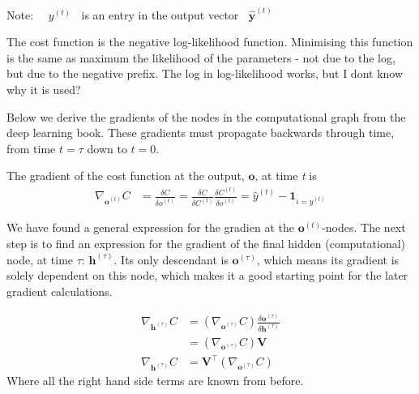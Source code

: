 \documentclass[12pt]{article}
\begin{document}
Note: $\quad y^{(t)} \;\;$ is an entry in the output vector $\;\; \mathbf{\hat{y}}^{(t)}$ \par
The cost function is the negative log-likelihood function. Minimising this function is the same as maximum the likelihood of the parameters - not due to the log, but due to the negative prefix. The log in log-likelihood works, but I dont know why it is used? \par
Below we derive the gradients of the nodes in the computational graph from the deep learning book. These gradients must propagate backwards through time, from time $t=\tau$ down to $t=0$.
\par
The gradient of the cost function at the output, $\mathbf{o}$, at time \textit{t} is
\begin{align}
    \nabla_{\mathbf{o}^{(t)}} C &= \frac{\delta C}{\delta o^{(t)}}
    = \frac{\delta C}{\delta C^{(t)}}\frac{\delta C^{(t)}}{\delta o^{(t)}}
    = \hat{y}^{(t)} - \mathbf{1}_{i=y^{(t)}}
\end{align}

We have found a general expression for the gradien at the $\mathbf{o}^{(t)}$-nodes. The next step is to find an expression for the gradient of the final hidden (computational) node, at time $\tau$: $\mathbf{h}^{(\tau)}$. Its only descendant is $\mathbf{o}^{(\tau)}$, which means its gradient is solely dependent on this node, which makes it a good starting point for the later gradient calculations.

\begin{align}
    \nabla_{\mathbf{h}^{(\tau)}} C &= \left(\nabla_{\mathbf{o}^{(\tau)}}C\right) \frac{\delta \mathbf{o}^{(\tau)}}{\delta \mathbf{h}^{(\tau)}}\\
    &= \left(\nabla_{\mathbf{o}^{(\tau)}}C\right) \mathbf{V}\\
    \nabla_{\mathbf{h}^{(\tau)}} C &= \mathbf{V}^{\top} \left(\nabla_{\mathbf{o}^{(\tau)}}C\right)
\end{align}
Where all the right hand side terms are known from before. \par
\end{document}
